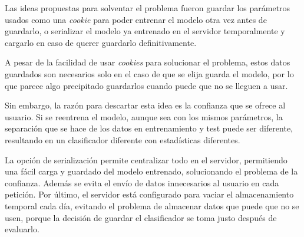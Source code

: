 Las ideas propuestas para solventar el problema fueron guardar los parámetros
usados como una \textit{cookie} para poder entrenar el modelo otra vez antes de
guardarlo, o serializar el modelo ya entrenado en el servidor temporalmente y
cargarlo en caso de querer guardarlo definitivamente.

A pesar de la facilidad de usar \textit{cookies} para solucionar el problema,
estos datos guardados son necesarios solo en el caso de que se elija guarda el
modelo, por lo que parece algo precipitado guardarlos cuando puede que no se
lleguen a usar.

Sin embargo, la razón para descartar esta idea es la confianza que se ofrece al
usuario. Si se reentrena el modelo, aunque sea con los mismos parámetros, la
separación que se hace de los datos en entrenamiento y test puede ser diferente,
resultando en un clasificador diferente con estadísticas diferentes.

La opción de serialización permite centralizar todo en el servidor, permitiendo
una fácil carga y guardado del modelo entrenado, solucionando el problema de la
confianza. Además se evita el envío de datos innecesarios al usuario en cada
petición. Por último, el servidor está configurado para vaciar el almacenamiento
temporal cada día, evitando el problema de almacenar datos que puede que no se
usen, porque la decisión de guardar el clasificador se toma justo después de
evaluarlo. 
